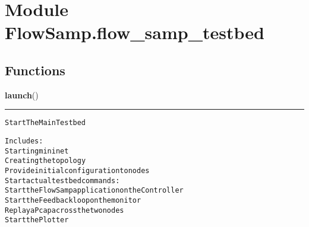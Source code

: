 %
%
%


\section{Module FlowSamp.flow\_samp\_testbed}

    \label{FlowSamp:flow_samp_testbed}


  \subsection{Functions}

    \label{FlowSamp:flow_samp_testbed:launch}

    \vspace{0.5ex}

\hspace{.8\funcindent}\begin{boxedminipage}{\funcwidth}

    \raggedright \textbf{launch}()

    \vspace{-1.5ex}

    \rule{\textwidth}{0.5\fboxrule}
\setlength{\parskip}{2ex}
\begin{alltt}
Start The Main Testbed

Includes:
Starting mininet
Creating the topology
Provide initial configuration to nodes
Start actual testbed commands:
    Start the FlowSamp application on the Controller
    Start the Feedback loop on the monitor
    Replay a Pcap across the two nodes
    Start the Plotter
\end{alltt}

\setlength{\parskip}{1ex}
    \end{boxedminipage}

